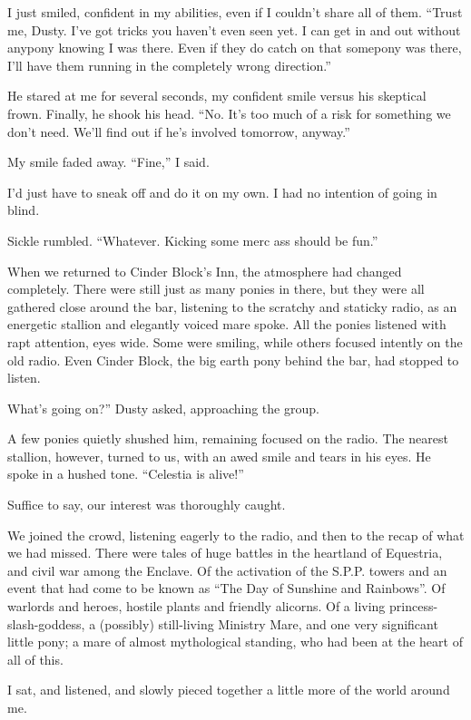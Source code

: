 I just smiled, confident in my abilities, even if I couldn’t share all of them. “Trust me, Dusty. I’ve got tricks you haven’t even seen yet. I can get in and out without anypony knowing I was there. Even if they do catch on that somepony was there, I’ll have them running in the completely wrong direction.”

He stared at me for several seconds, my confident smile versus his skeptical frown. Finally, he shook his head. “No. It’s too much of a risk for something we don’t need. We’ll find out if he’s involved tomorrow, anyway.”

My smile faded away. “Fine,” I said.

I’d just have to sneak off and do it on my own. I had no intention of going in blind.

Sickle rumbled. “Whatever. Kicking some merc ass should be fun.”

When we returned to Cinder Block’s Inn, the atmosphere had changed completely. There were still just as many ponies in there, but they were all gathered close around the bar, listening to the scratchy and staticky radio, as an energetic stallion and elegantly voiced mare spoke. All the ponies listened with rapt attention, eyes wide. Some were smiling, while others focused intently on the old radio. Even Cinder Block, the big earth pony behind the bar, had stopped to listen.

\leavevmode{}What’s going on?” Dusty asked, approaching the group.

A few ponies quietly shushed him, remaining focused on the radio. The nearest stallion, however, turned to us, with an awed smile and tears in his eyes. He spoke in a hushed tone. “Celestia is alive!”

Suffice to say, our interest was thoroughly caught.

We joined the crowd, listening eagerly to the radio, and then to the recap of what we had missed. There were tales of huge battles in the heartland of Equestria, and civil war among the Enclave. Of the activation of the S.P.P. towers and an event that had come to be known as “The Day of Sunshine and Rainbows”. Of warlords and heroes, hostile plants and friendly alicorns. Of a living princess-slash-goddess, a (possibly) still-living Ministry Mare, and one very significant little pony; a mare of almost mythological standing, who had been at the heart of all of this.

I sat, and listened, and slowly pieced together a little more of the world around me.